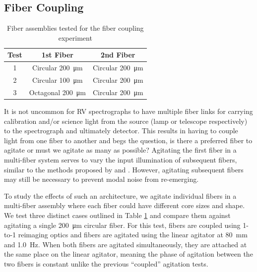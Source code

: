 \documentclass[twocolumn]{emulateapj}
\begin{document}
\subsection{Fiber Coupling}

\begin{table}
\centering
\caption{Fiber assemblies tested for the fiber coupling experiment}
	\begin{tabular}{ccc}
	\hline
	Test & 1st Fiber & 2nd Fiber \\
	\hline \hline
	1 & Circular \SI{200}{\micro\meter} & Circular \SI{200}{\micro\meter} \\
	\hline
	2 & Circular \SI{100}{\micro\meter} & Circular \SI{200}{\micro\meter} \\
	\hline
	3 & Octagonal \SI{200}{\micro\meter} & Circular \SI{200}{\micro\meter} \\
	\hline
	\end{tabular}
\label{table:fiber_coupling}
\end{table}

It is not uncommon for RV spectrographs to have multiple fiber links for carrying calibration and/or science light from the source (lamp or telescope respectively) to the spectrograph and ultimately detector. This results in having to couple light from one fiber to another and begs the question, is there a preferred fiber to agitate or must we agitate as many as possible? Agitating the first fiber in a multi-fiber system serves to vary the input illumination of subsequent fibers, similar to the methods proposed by \citet{Mahadevan2014} and \citet{Halverson2014}. However, agitating subsequent fibers may still be necessary to prevent modal noise from re-emerging.

To study the effects of such an architecture, we agitate individual fibers in a multi-fiber assembly where each fiber could have different core sizes and shape. We test three distinct cases outlined in Table \ref{table:fiber_coupling} and compare them against agitating a single \SI{200}{\micro\meter} circular fiber. For this test, fibers are coupled using 1-to-1 reimaging optics and fibers are agitated using the linear agitator at \SI{80}{\milli\meter} and \SI{1.0}{\hertz}. When both fibers are agitated simultaneously, they are attached at the same place on the linear agitator, meaning the phase of agitation between the two fibers is constant unlike the previous ``coupled'' agitation tests.
\end{document}
